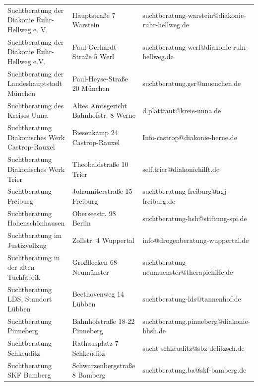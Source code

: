{\begin{xltabular}{\textwidth} {
 >{\raggedright\arraybackslash}p{5cm}
 >{\raggedright\arraybackslash}X
 >{\raggedright\arraybackslash}p{5cm} }
Suchtberatung der Diakonie Ruhr-Hellweg e. V. & Hauptstraße 7 Warstein & suchtberatung-warstein@diakonie-ruhr-hellweg.de \\
Suchtberatung der Diakonie Ruhr-Hellweg e.V. & Paul-Gerhardt-Straße 5 Werl & suchtberatung-werl@diakonie-ruhr-hellweg.de \\
Suchtberatung der Landeshauptstadt München & Paul-Heyse-Straße 20 München & suchtberatung.gsr@muenchen.de \\
Suchtberatung des Kreises Unna & Altes Amtsgericht Bahnhofstr. 8 Werne & d.plattfaut@kreis-unna.de \\
Suchtberatung Diakonisches Werk Castrop-Rauxel & Biesenkamp 24 Castrop-Rauxel & Info-castrop@diakonie-herne.de \\
Suchtberatung Diakonisches Werk Trier & Theobaldstraße 10 Trier & self.trier@diakoniehilft.de \\
Suchtberatung Freiburg & Johanniterstraße 15 Freiburg & suchtberatung-freiburg@agj-freiburg.de \\
Suchtberatung Hohenschönhausen & Oberseestr. 98 Berlin & suchtberatung-hsh@stiftung-spi.de \\
Suchtberatung im Justizvollzug & Zollstr. 4 Wuppertal & info@drogenberatung-wuppertal.de \\
Suchtberatung in der alten Tuchfabrik & Großflecken 68 Neumünster & suchtberatung-neumuenster@therapiehilfe.de \\
Suchtberatung LDS, Standort Lübben & Beethovenweg 14 Lübben & suchtberatung-lds@tannenhof.de \\
Suchtberatung Pinneberg & Bahnhofstraße 18-22 Pinneberg & suchtberatung.pinneberg@diakonie-hhsh.de \\
Suchtberatung Schkeuditz & Rathausplatz 7 Schkeuditz & sucht-schkeuditz@sbz-delitzsch.de \\
Suchtberatung SKF Bamberg & Schwarzenbergstraße 8 Bamberg & suchtberatung.ba@skf-bamberg.de \\

\end{xltabular}}
